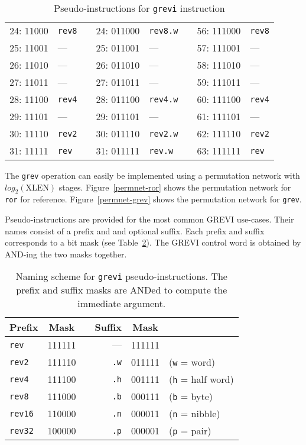 \begin{table}[t]
\begin{small}
\begin{center}
\begin{tabular}{r l p{0.5in} r l p{0.3in} r l}
24: 11000 & {\tt rev8}    &   & 24: 011000 & {\tt rev8.w}  &   & 56: 111000 & {\tt rev8}  \\
25: 11001 & ---           &   & 25: 011001 & ---           &   & 57: 111001 & ---         \\
26: 11010 & ---           &   & 26: 011010 & ---           &   & 58: 111010 & ---         \\
27: 11011 & ---           &   & 27: 011011 & ---           &   & 59: 111011 & ---         \\
28: 11100 & {\tt rev4}    &   & 28: 011100 & {\tt rev4.w}  &   & 60: 111100 & {\tt rev4}  \\
29: 11101 & ---           &   & 29: 011101 & ---           &   & 61: 111101 & ---         \\
30: 11110 & {\tt rev2}    &   & 30: 011110 & {\tt rev2.w}  &   & 62: 111110 & {\tt rev2}  \\
31: 11111 & {\tt rev}     &   & 31: 011111 & {\tt rev.w}   &   & 63: 111111 & {\tt rev}   \\
\end{tabular}
\end{center}
\end{small}
\caption{Pseudo-instructions for {\tt grevi} instruction}
\label{grevi-modes}
\end{table}

The {\tt grev} operation can easily be implemented using a permutation
network with $log_2(\textrm{XLEN})$ stages. Figure~\ref{permnet-ror}
shows the permutation network for {\tt ror} for reference.
Figure~\ref{permnet-grev} shows the permutation network for {\tt grev}.

Pseudo-instructions are provided for the most common GREVI use-cases. Their names
consist of a prefix and and optional suffix. Each prefix and suffix corresponds
to a bit mask (see Table~\ref{grevi-names}). The GREVI control word is obtained
by AND-ing the two masks together.

\begin{table}[!h]
\begin{center}
\begin{tabular}{lcp{1cm}rcl}
Prefix & Mask & & Suffix & Mask \\
\hline
{\tt rev}   & 111111 & &      --- & 111111 \\
{\tt rev2}  & 111110 & & {\tt .w} & 011111 & ({\tt w} = word)\\
{\tt rev4}  & 111100 & & {\tt .h} & 001111 & ({\tt h} = half word)\\
{\tt rev8}  & 111000 & & {\tt .b} & 000111 & ({\tt b} = byte)\\
{\tt rev16} & 110000 & & {\tt .n} & 000011 & ({\tt n} = nibble)\\
{\tt rev32} & 100000 & & {\tt .p} & 000001 & ({\tt p} = pair)\\
\end{tabular}
\end{center}
\caption{Naming scheme for {\tt grevi} pseudo-instructions. The prefix and
suffix masks are ANDed to compute the immediate argument.}
\label{grevi-names}
\end{table}

